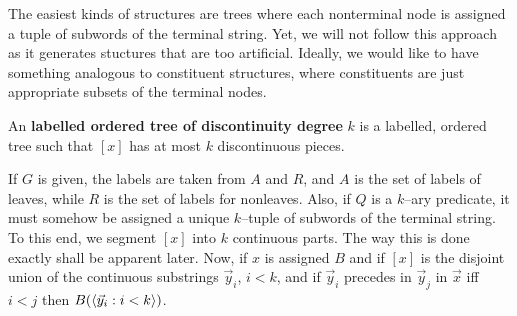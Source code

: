 The easiest kinds of structures are trees where each nonterminal 
node is assigned a tuple of subwords of the terminal string. Yet, 
we will not follow this approach as it generates stuctures that are 
too artificial. Ideally, we would like to have something analogous to 
constituent structures, where constituents are just appropriate 
subsets of the terminal nodes. 
\begin{defn}
An \textbf{labelled ordered tree of discontinuity degree} $k$ is a 
labelled, ordered tree such that $[x]$ has at most $k$ discontinuous 
pieces.
\end{defn}
If $G$ is given, the labels are taken from $A$ and $R$, and $A$ is 
the set of labels of leaves, while $R$ is the set of labels for 
nonleaves. Also, if $Q$ is a $k$--ary predicate, it must somehow 
be assigned a unique $k$--tuple of subwords of the terminal string.
To this end, we segment $[x]$ into $k$ continuous parts. The way 
this is done exactly shall be apparent later. Now, if $x$ is 
assigned $B$ and if $[x]$ is the disjoint union of the continuous 
substrings $\vec{y}_i$, $i < k$, and if $\vec{y}_i$ precedes in 
$\vec{y}_j$ in $\vec{x}$ iff $i < j$ then $B(\langle \vec{y}_i : i < k\rangle)$.

